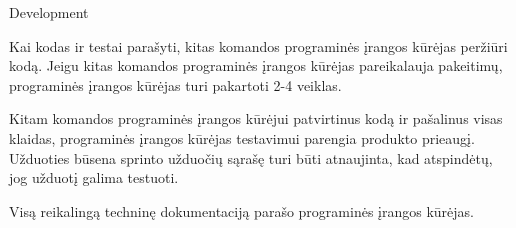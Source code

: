 \begin{processTable}{Development}
{        \item Kai kodas ir testai parašyti, kitas komandos programinės įrangos kūrėjas peržiūri kodą. Jeigu kitas komandos programinės įrangos kūrėjas pareikalauja pakeitimų, programinės įrangos kūrėjas turi pakartoti 2-4 veiklas.

        \item Kitam komandos programinės įrangos kūrėjui patvirtinus kodą ir pašalinus visas klaidas, programinės įrangos kūrėjas testavimui parengia
         produkto prieaugį. %
         Užduoties būsena sprinto užduočių sąrašę turi būti atnaujinta, kad atspindėtų, jog užduotį galima testuoti.
         

        \item Visą reikalingą techninę dokumentaciją parašo programinės įrangos kūrėjas.
    }
\end{processTable}

\newpage
\subsubsection{}

